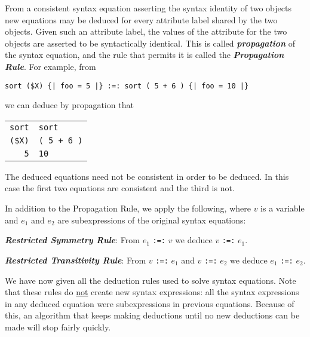 \documentclass[12pt]{article}
\newcommand{\key}[1]{{\bf \em #1}\index{#1}}
\newcommand{\ikey}[2]{{\bf \em #1}\index{#2}}
\newenvironment{indpar}[1][0.3in]%
	{\begin{list}{}%
		     {\setlength{\itemsep}{0in}%
		      \setlength{\topsep}{0in}%
		      \setlength{\parsep}{1ex}%
		      \setlength{\labelwidth}{#1}%
		      \setlength{\leftmargin}{#1}%
		      \addtolength{\leftmargin}{\labelsep}}%
	 \item}%
	{\end{list}}
\begin{document}
From a consistent syntax equation asserting the syntax identity
of two objects new equations may be deduced for every attribute
label shared by the two objects.
Given such an attribute label, the values
of the attribute for the two objects are asserted to be syntactically
identical.  This is called \key{propagation}
of the syntax equation, and the rule that permits it is called
the \ikey{Propagation Rule}{propagation rule}\label{PROPAGATION-RULE}.
For example, from

\begin{center}
\verb/sort ($X) {| foo = 5 |} :=: sort ( 5 + 6 ) {| foo = 10 |}/
\end{center}

we can deduce by propagation that

\begin{center}
\begin{tabular}{r@{\tt ~:=:~}l}
\verb/sort/ & \verb/sort/ \\
\verb/($X)/ & \verb/( 5 + 6 )/ \\
\verb/5/ & \verb/10/
\end{tabular}
\end{center}

The deduced equations need not be consistent in order to be deduced.
In this case the first two equations are consistent and the third is not.

In addition to the Propagation Rule, we apply the following, where
$v$ is a variable and $e_1$ and $e_2$ are subexpressions of the original
syntax equations:

\begin{indpar}
\begin{list}{}{}
\item [\ikey{Restricted Symmetry Rule}{restricted symmetry rule}:]%
\label{RESTRICTED-SYMMETRY-RULE}
From $e_1$ {\tt :=:} $v$ we deduce $v$ {\tt :=:} $e_1$.

\item [\ikey{Restricted Transitivity Rule}{restricted transitivity rule}:]%
\label{RESTRICTED-TRANSITIVITY-RULE}
From $v$ {\tt :=:} $e_1$ and $v$ {\tt :=:} $e_2$
we deduce $e_1$ {\tt :=:} $e_2$.
\end{list}
\end{indpar}

We have now given all the deduction rules used to solve syntax equations.
Note that these rules do \underline{not} create new syntax expressions:
all the syntax expressions in any deduced equation were subexpressions
in previous equations.  Because of this,
an algorithm that keeps making deductions until
no new deductions can be made will stop fairly quickly.
\end{document}
